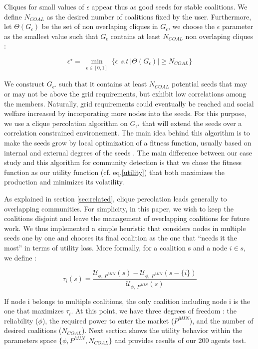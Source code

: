 \documentclass[conference]{IEEEtran}
\begin{document}
Cliques for small values of $ \epsilon $ appear thus as good seeds for stable coalitions. We define $ N_{COAL} $ as the desired number of coalitions fixed by the user. Furthermore, let $ \Theta(G_{\epsilon}) $ be the set of non overlaping cliques in $ G_{\epsilon} $, we choose the $ \epsilon $ parameter as the smallest value such that $ G_{\epsilon} $ contains at least $ N_{COAL} $ non overlaping cliques :

\begin{equation}
\epsilon^{\star} = \min_{\substack{ \epsilon \in [0,1] }} \Big\{ \epsilon\,\ s.t\ |\Theta(G_{\epsilon})| \geq N_{COAL} \Big\}
\end{equation}

We construct $ G_{\epsilon^{\star}} $ such that it contains at least $ N_{COAL} $ potential seeds that may or may not be above the grid requirements, but exhibit low correlations among the members. Naturally, grid requirements could eventually be reached and social welfare increased by incorporating more nodes into the seeds. For this purpose, we use a clique percolation algorithm on $ G_{\epsilon^{\star}} $ that will extend the seeds over a correlation constrained environement. The main idea behind this algorithm is to make the seeds grow by local optimization of a fitness function, usually based on internal and external degrees of the seeds \cite{Lancichinetti}. The main difference between our case study and this algorithm for community detection is that we chose the fitness function as our utility function (cf. eq.\eqref{utility}) that both maximizes the production and minimizes its volatility.  

As explained in section \ref{sec:related}, clique percolation leads generally to overlapping communities. For simplicity, in this paper, we wish to keep the coalitions disjoint and  leave the management of overlapping coalitions for future work. We thus implemented a simple heuristic that considers nodes in multiple seeds one by one and chooses its final coalition as the one that “needs it the most” in terms of utility loss. More formally, for a coalition s and a node $ i \in s $, we define :

\begin{equation}
\tau_{i}(s) = \dfrac{\mathcal{U}_{\phi,\ P^{MIN}}(s) - \mathcal{U}_{\phi,\ P^{MIN}}(s-\{i\}) }{\mathcal{U}_{\phi,\ P^{MIN}}(s)}
\label{tau}
\end{equation}

If node i belongs to  multiple coalitions, the only coalition including node i is the one that maximizes $ \tau_{i} $. At this point, we have three degrees of freedom : the reliability ($ \phi $), the required power to enter the market ($P^{MIN}$), and the number of desired coalitions ($ N_{COAL} $). Next section shows the utility behavior within the parameters space $ \{\phi,P^{MIN},N_{COAL} \} $ and provides results of our 200 agents test.
\end{document}
